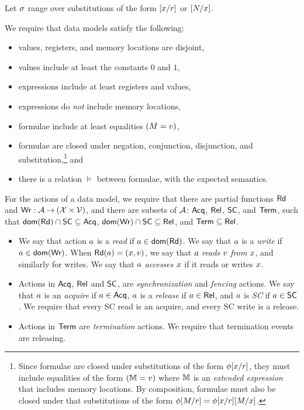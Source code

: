 Let $\sigma$ range over substitutions of the form
$[x/r]$ or $[N/x]$.

We require that data models satisfy the following:
\begin{itemize}
\item values, registers, and memory locations are disjoint,
\item values include at least the constants $0$ and $1$,
\item expressions include at least registers and values,
\item expressions do \emph{not} include memory locations, %
\item formulae include at least %
  equalities %
  $(M=v)$, %
\item formulae are closed under negation, conjunction, disjunction, and
  substitution,\!\footnote{Since formulae are closed under substitutions of the
    form $\phi[x/r]$, they must include equalities of the form
    $(\mathbb{M}=v)$ where $\mathbb{M}$ is an \emph{extended expression} that
    includes memory locations.  By composition, formulae must also be closed
    under that substitutions of the form
    $\phi[M/r]=\phi[x/r][M/x]$.} and
\item there is a relation $\vDash$ between formulae, with the expected semantics.
\end{itemize}

For the actions of a data model, we require that
there are partial functions $\mathsf{Rd}$ and
$\mathsf{Wr}: \mathcal{A} \mathbin\rightarrow (\mathcal{X} \times \mathcal{V})$, and there are subsets of $\mathcal{A}$:
$\mathsf{Acq}$, $\mathsf{Rel}$, $\mathsf{SC}$, and $\mathsf{Term}$,
such that
$\mathsf{dom}(\mathsf{Rd})\cap\mathsf{SC}\subseteq\mathsf{Acq}$,
$\mathsf{dom}(\mathsf{Wr})\cap\mathsf{SC}\subseteq\mathsf{Rel}$, and
$\mathsf{Term}\subseteq\mathsf{Rel}$.

\begin{itemize}    
\item We say that action $a$ is a \emph{read} if
  $a\in\mathsf{dom}(\mathsf{Rd})$. We say that $a$ is a \emph{write} if
  $a\in\mathsf{dom}(\mathsf{Wr})$.  When $\mathsf{Rd}(a) = (x,v)$,
  we say that $a$ \emph{reads} $v$ \emph{from} $x$, and
  similarly for writes.  We say that $a$ \emph{accesses} $x$ if it
  reads or writes $x$.

\item Actions in $\mathsf{Acq}$, $\mathsf{Rel}$ and $\mathsf{SC}$, are \emph{synchronization} and
  \emph{fencing} actions.  We say that $a$ is an \emph{acquire} if
  $a\in\mathsf{Acq}$, $a$ is a \emph{release} if $a\in\mathsf{Rel}$, and
  $a$ is \emph{SC} if $a\in\mathsf{SC}$.  We require that every SC read is
  an acquire, and every SC write is a release.

  
\item Actions in $\mathsf{Term}$ are \emph{termination} actions. We
  require %
  that termination events are releasing.
\end{itemize}

